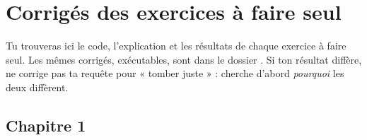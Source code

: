 \chapter*{Corrigés des exercices à faire seul}


Tu trouveras ici le code, l'explication et les résultats de chaque exercice à faire seul. Les mêmes
corrigés, exécutables, sont dans le dossier . Si ton résultat diffère, ne corrige pas
ta requête pour « tomber juste » : cherche d'abord \emph{pourquoi} les deux diffèrent.

\section*{Chapitre 1}

